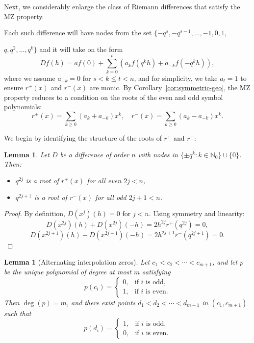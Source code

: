 \documentclass{raex}
\newtheorem{lemma}[theorem]{Lemma}
\theoremstyle{definition}
\begin{document}
Next, we considerably enlarge the class of Riemann differences that satisfy the MZ property.

Each such difference will have nodes from the set \(\{-q^s,-q^{s-1},\ldots,-1,0,1,\)

\noindent \(q,q^2,\ldots, q^k\}\) and it will take on the form
\[
Df(h) = a f(0) + \sum_{k = 0}^t \left( a_k f(q^k h) + a_{-k} f(-q^k h) \right),
\]
where we assume $a_{-k} = 0$ for $s < k \leq t<n$, and for simplicity, we take $a_t = 1$ to ensure $r^+(x)$ and $r^-(x)$ are monic. By Corollary~\ref{cor:symmetric-geo}, the MZ property reduces to a condition on the roots of the even and odd symbol polynomials:
\[
r^+(x) = \sum_{k \geq 0} (a_k + a_{-k}) x^k, \quad r^-(x) = \sum_{k \geq 0} (a_k - a_{-k}) x^k.
\]

We begin by identifying the structure of the roots of $r^+$ and $r^-$:

\begin{lemma}\label{l5.4}
Let $D$ be a difference of order $n$ with nodes in $\{\pm q^k : k \in \mathbb{N}_0\} \cup \{0\}$. Then:
\begin{itemize}
  \item $q^{2j}$ is a root of $r^+(x)$ for all even $2j < n$,
  \item $q^{2j+1}$ is a root of $r^-(x)$ for all odd $2j + 1 < n$.
\end{itemize}
\end{lemma}

\begin{proof}
By definition, $D(x^j)(h) = 0$ for $j < n$. Using symmetry and linearity:
\[
D(x^{2j})(h) + D(x^{2j})(-h) = 2 h^{2j} r^+(q^{2j}) = 0,
\]
\[
D(x^{2j+1})(h) - D(x^{2j+1})(-h) = 2 h^{2j+1} r^-(q^{2j+1}) = 0.
\]
\end{proof}


\begin{lemma}[Alternating interpolation zeros]\label{l1}
Let \( c_1 < c_2 < \cdots < c_{m+1} \), and let \( p \) be the unique polynomial of degree at most \( m \) satisfying
\[
p(c_i) =
\begin{cases}
0, & \text{if } i \text{ is odd}, \\
1, & \text{if } i \text{ is even}.
\end{cases}
\]
Then \( \deg(p) = m \), and there exist points \( d_1 < d_2 < \cdots < d_{m-1} \) in \( (c_1, c_{m+1}) \) such that
\[
p(d_i) =
\begin{cases}
1, & \text{if } i \text{ is odd}, \\
0, & \text{if } i \text{ is even}.
\end{cases}
\]
\end{lemma}
\end{document}
